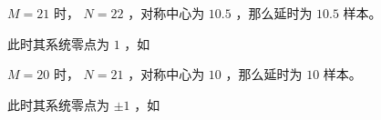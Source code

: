 \documentclass[lang=cn,11pt,a4paper,cite=authoryear,twocolumn]{elegantpaper}
\begin{document}

\(M = 21\) 时， \(N = 22\) ，对称中心为 \(10.5\) ，那么延时为 \(10.5\) 样本。

此时其系统零点为 \(1\) ，如 



\(M = 20\) 时， \(N = 21\) ，对称中心为 \(10\) ，那么延时为 \(10\) 样本。

此时其系统零点为 \(\pm 1\) ，如 




\end{document}
